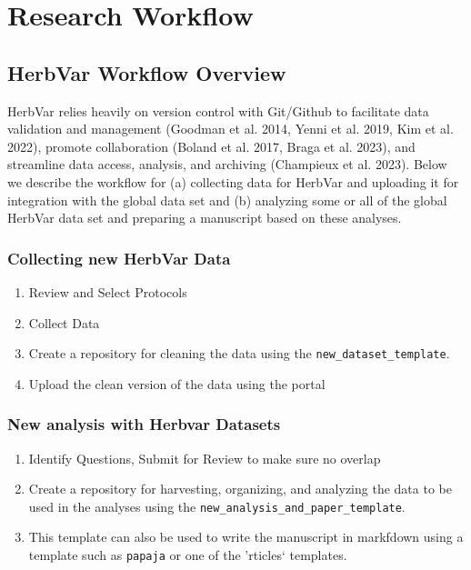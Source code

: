 \documentclass[
  letterpaper,
  DIV=11,
  numbers=noendperiod]{scrreprt}
\providecommand{\tightlist}{%
  \setlength{\itemsep}{0pt}\setlength{\parskip}{0pt}}\usepackage{longtable,booktabs,array}
\begin{document}
\part{Research Workflow}

\chapter{HerbVar Workflow Overview}\label{sec-workflow}

HerbVar relies heavily on version control with Git/Github to facilitate
data validation and management (Goodman et al. 2014, Yenni et al. 2019,
Kim et al. 2022), promote collaboration (Boland et al. 2017, Braga et
al. 2023), and streamline data access, analysis, and archiving
(Champieux et al. 2023). Below we describe the workflow for (a)
collecting data for HerbVar and uploading it for integration with the
global data set and (b) analyzing some or all of the global HerbVar data
set and preparing a manuscript based on these analyses.

\section{Collecting new HerbVar Data}\label{collecting-new-herbvar-data}

\begin{enumerate}
\def\labelenumi{\arabic{enumi}.}
\tightlist
\item
  Review and Select Protocols
\item
  Collect Data
\item
  Create a repository for cleaning the data using the
  \texttt{new\_dataset\_template}.
\item
  Upload the clean version of the data using the portal
\end{enumerate}

\section{New analysis with Herbvar
Datasets}\label{new-analysis-with-herbvar-datasets}

\begin{enumerate}
\def\labelenumi{\arabic{enumi}.}
\tightlist
\item
  Identify Questions, Submit for Review to make sure no overlap
\item
  Create a repository for harvesting, organizing, and analyzing the data
  to be used in the analyses using the
  \texttt{new\_analysis\_and\_paper\_template}.
\item
  This template can also be used to write the manuscript in markfdown
  using a template such as \texttt{papaja} or one of the 'rticles`
  templates.
\end{enumerate}
\end{document}
